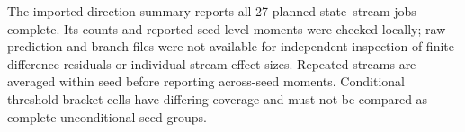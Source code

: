 The imported direction summary reports all 27 planned state--stream jobs complete. Its counts and reported seed-level moments were checked locally; raw prediction and branch files were not available for independent inspection of finite-difference residuals or individual-stream effect sizes. Repeated streams are averaged within seed before reporting across-seed moments. Conditional threshold-bracket cells have differing coverage and must not be compared as complete unconditional seed groups.

